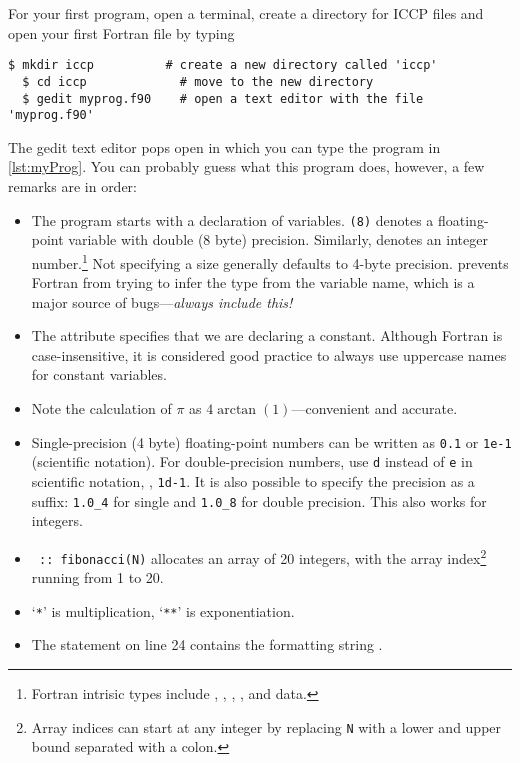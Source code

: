For your first program, open a terminal, create a directory for ICCP files and open your first Fortran file by typing
\begin{lstlisting}[style=prompt, nolol]
  $ mkdir iccp          # create a new directory called 'iccp'
  $ cd iccp             # move to the new directory
  $ gedit myprog.f90    # open a text editor with the file 'myprog.f90'
\end{lstlisting}
The gedit text editor pops open in which you can type the program in \autoref{lst:myProg}.
You can probably guess what this program does, however, a few remarks are in order:
\begin{itemize}
  \item The program starts with a declaration of variables.
    \texttt{(8)} denotes a floating-point variable with double (8 byte) precision.
    Similarly,  denotes an integer number.\footnote{Fortran intrisic types include , , , , and  data.}
    Not specifying a size generally defaults to 4-byte precision.
     prevents Fortran from trying to infer the type from the variable name, which is a major source of bugs---\emph{always include this!}
  \item The attribute  specifies that we are declaring a constant.
    Although Fortran is case-insensitive, it is considered good practice to always use uppercase names for constant variables.
  \item Note the calculation of $\pi$ as $4\arctan(1)$---convenient and accurate.
  \item Single-precision (4 byte) floating-point numbers can be written as \texttt{0.1} or \texttt{1e-1} (scientific notation).
    For double-precision numbers, use \texttt{d} instead of \texttt{e} in scientific notation, \eg, \texttt{1d-1}.
    It is also possible to specify the precision as a suffix: \texttt{1.0\_4} for single and \texttt{1.0\_8} for double precision.
    This also works for integers.
  \item \texttt{ :: fibonacci(N)} allocates an array of 20
    integers, with the array index\footnote{Array indices can start at any integer by replacing \texttt{N} with a lower and upper bound separated with a colon.} running from 1 to 20.
  \item `\texttt{*}' is multiplication, `\texttt{**}' is exponentiation.
  \item The  statement on line 24 contains the formatting string .

\end{itemize}
